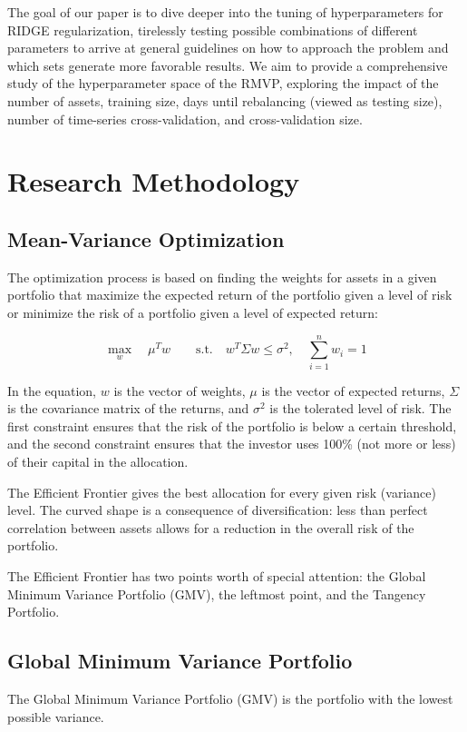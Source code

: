 \documentclass{article}
\begin{document}
The goal of our paper is to dive deeper into the tuning of hyperparameters for RIDGE regularization, tirelessly testing possible combinations of different parameters to arrive at general guidelines on how to approach the problem and which sets generate more favorable results. We aim to provide a comprehensive study of the hyperparameter space of the RMVP, exploring the impact of the number of assets, training size, days until rebalancing (viewed as testing size), number of time-series cross-validation, and cross-validation size.

\section{Research Methodology}
\subsection{Mean-Variance Optimization}
The optimization process is based on finding the weights for assets in a given portfolio that maximize the expected return of the portfolio given a level of risk or minimize the risk of a portfolio given a level of expected return:

$$
\max_{w} \quad \mu^{T} w \quad \quad
\text{s.t.} \quad w^{T} \Sigma w \leq \sigma^{2}, \quad
\sum_{i=1}^{n} w_{i} = 1
$$

In the equation, $w$ is the vector of weights, $\mu$ is the vector of expected returns, $\Sigma$ is the covariance matrix of the returns, and $\sigma^{2}$ is the tolerated level of risk. The first constraint ensures that the risk of the portfolio is below a certain threshold, and the second constraint ensures that the investor uses 100\% (not more or less) of their capital in the allocation.

The Efficient Frontier gives the best allocation for every given risk (variance) level. The curved shape is a consequence of diversification: less than perfect correlation between assets allows for a reduction in the overall risk of the portfolio.

The Efficient Frontier has two points worth of special attention: the Global Minimum Variance Portfolio (GMV), the leftmost point, and the Tangency Portfolio.

\subsection{Global Minimum Variance Portfolio}
The Global Minimum Variance Portfolio (GMV) is the portfolio with the lowest possible variance.
\end{document}
